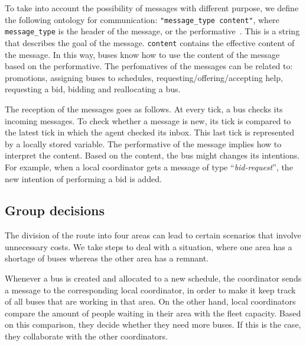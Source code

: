 To take into account the possibility of messages with different purpose, we define the following ontology for communication: \texttt{"message\_type content"}, where  \texttt{message\_type} is the header of the message, or the performative~\cite{fipa}. This is a string that describes the goal of the message. \texttt{content} contains the effective content of the message. In this way, buses know how to use the content of the message based on the performative. The perfomatives of the messages can be related to: promotions, assigning buses to schedules, requesting/offering/accepting help, requesting a bid, bidding and reallocating a bus. 

The reception of the messages goes as follows. At every tick, a bus checks its incoming messages. To check whether a message is new, its tick is compared to the latest tick in which the agent checked its inbox. This last tick is represented by a locally stored variable. The performative of the message implies how to interpret the content. Based on the content, the bus might changes its intentions. For example, when a local coordinator gets a message of type ``\textit{bid-request}'', the new intention of performing a bid is added.

\subsection{Group decisions}

The division of the route into four areas can lead to certain scenarios that involve unnecessary costs. We take steps to deal with a situation, where one area has a shortage of buses whereas the other area has a remnant. 

Whenever a bus is created and allocated to a new schedule, the coordinator sends a message to the corresponding local coordinator, in order to make it keep track of all buses that are working in that area. On the other hand, local coordinators compare the amount of people waiting in their area with the fleet capacity. Based on this comparison, they decide whether they need more buses. If this is the case, they collaborate with the other coordinators. 

